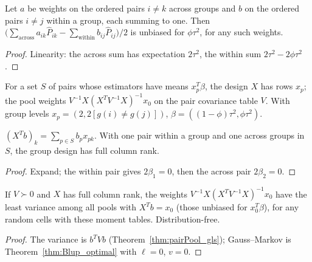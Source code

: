 \begin{corollary}\label{cor:phiTauPooled}
  \leanok
  Let $a$ be weights on the ordered pairs $i \ne k$ across groups and $b$ on the
  ordered pairs $i \ne j$ within a group, each summing to one. Then
  $\bigl(\sum_{\mathrm{across}} a_{ik}\widehat P_{ik} - \sum_{\mathrm{within}} b_{ij}\widehat P_{ij}\bigr)/2$
  is unbiased for $\phi\tau^2$, for any such weights.
\end{corollary}
\begin{proof}
  \leanok
  Linearity: the across sum has expectation $2\tau^2$, the within sum $2\tau^2 - 2\phi\tau^2$.
\end{proof}

\begin{definition}\label{def:pairDesign}
  \leanok
  For a set $S$ of pairs whose estimators have means $x_p^T\beta$, the design $X$ has rows $x_p$;
  the pool weights $V^{-1}X(X^TV^{-1}X)^{-1}x_0$ on the pair covariance table $V$. With group
  levels $x_p = (2, 2[g(i) \ne g(j)])$, $\beta = ((1-\phi)\tau^2, \phi\tau^2)$.
\end{definition}

\begin{lemma}\label{lem:pairDesign_mulVec}
  \leanok
  $(X^Tb)_k = \sum_{p \in S} b_p x_{pk}$. With one pair within a group and one across groups in $S$,
  the group design has full column rank.
\end{lemma}
\begin{proof}
  \leanok
  Expand; the within pair gives $2\beta_1 = 0$, then the across pair $2\beta_2 = 0$.
\end{proof}

\begin{theorem}\label{thm:pairPool_blue}
  \leanok
  If $V \succ 0$ and $X$ has full column rank, the weights $V^{-1}X(X^TV^{-1}X)^{-1}x_0$ have the
  least variance among all pools with $X^Tb = x_0$ (those unbiased for $x_0^T\beta$), for any random
  cells with these moment tables. Distribution-free.
\end{theorem}
\begin{proof}
  \leanok
  The variance is $b^TVb$ (Theorem~\ref{thm:pairPool_gls}); Gauss--Markov is
  Theorem~\ref{thm:Blup_optimal} with $\ell = 0$, $v = 0$.
\end{proof}

